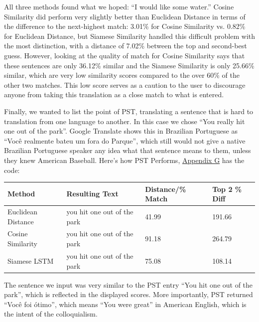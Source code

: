 \documentclass[runningheads]{llncs}
\begin{document}
	All three methods found what we hoped: ``I would like some water.'' Cosine Similarity did perform very slightly better than Euclidean Distance in terms of the difference to the next-highest match: 3.01\% for Cosine Similarity vs. 0.82\% for Euclidean Distance, but Siamese Similarity handled this difficult problem with the most distinction, with a distance of 7.02\% between the top and second-best guess. However, looking at the quality of match for Cosine Similarity says that these sentences are only 36.12\% similar and the Siamese Similarity is only 25.66\% similar, which are very low similarity scores compared to the over 60\% of the other two matches. This low score serves as a caution to the user to discourage anyone from taking this translation as a close match to what is entered.

	Finally, we wanted to list the point of PST, translating a sentence that is hard to translation from one language to another. In this case we chose ``You really hit one out of the park''. Google Translate shows this in Brazilian Portuguese as ``Você realmente bateu um fora do Parque'', which still would not give a native Brazilian Portuguese speaker any idea what that sentence means to them, unless they knew American Baseball. Here's how PST Performs, \hyperlink{Appendix G}{Appendix G} has the code:




	\begin{table} 
		\begin{center}
			\begin{tabular}{| l | l | l | l |}
			  \hline			
			  Method & Resulting Text & Distance/\% Match & Top 2 \% Diff \\
			  \hline			
			  Euclidean Distance & you hit one out of the park & 41.99 & 191.66 \\
			  \hline			
			  Cosine Similarity & you hit one out of the park & 91.18 & 264.79 \\
			  \hline  
			  Siamese LSTM & you hit one out of the park & 75.08 & 108.14 \\
			  \hline
			\end{tabular}
		\end{center}
		\label{table:``You Really Hit One Out of the Park'' Test}
	\end{table}

	The sentence we input was very similar to the PST entry ``You hit one out of the park'', which is reflected in the displayed scores. More importantly, PST returned ``Você foi ótimo'', which means ``You were great'' in American English, which is the intent of the colloquialism. 
\end{document}

